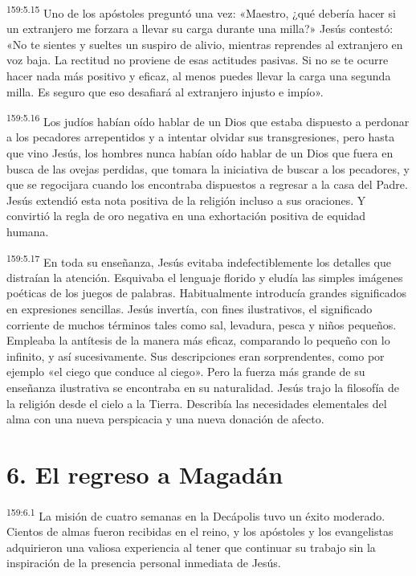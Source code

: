 \par 
\textsuperscript{159:5.15} Uno de los apóstoles preguntó una vez: «Maestro, ¿qué debería hacer si un extranjero me forzara a llevar su carga durante una milla?» Jesús contestó: «No te sientes y sueltes un suspiro de alivio, mientras reprendes al extranjero en voz baja. La rectitud no proviene de esas actitudes pasivas. Si no se te ocurre hacer nada más positivo y eficaz, al menos puedes llevar la carga una segunda milla. Es seguro que eso desafiará al extranjero injusto e impío».

\par 
\textsuperscript{159:5.16} Los judíos habían oído hablar de un Dios que estaba dispuesto a perdonar a los pecadores arrepentidos y a intentar olvidar sus transgresiones, pero hasta que vino Jesús, los hombres nunca habían oído hablar de un Dios que fuera en busca de las ovejas perdidas, que tomara la iniciativa de buscar a los pecadores, y que se regocijara cuando los encontraba dispuestos a regresar a la casa del Padre. Jesús extendió esta nota positiva de la religión incluso a sus oraciones. Y convirtió la regla de oro negativa en una exhortación positiva de equidad humana.

\par 
\textsuperscript{159:5.17} En toda su enseñanza, Jesús evitaba indefectiblemente los detalles que distraían la atención. Esquivaba el lenguaje florido y eludía las simples imágenes poéticas de los juegos de palabras. Habitualmente introducía grandes significados en expresiones sencillas. Jesús invertía, con fines ilustrativos, el significado corriente de muchos términos tales como sal, levadura, pesca y niños pequeños. Empleaba la antítesis de la manera más eficaz, comparando lo pequeño con lo infinito, y así sucesivamente. Sus descripciones eran sorprendentes, como por ejemplo «el ciego que conduce al ciego». Pero la fuerza más grande de su enseñanza ilustrativa se encontraba en su naturalidad. Jesús trajo la filosofía de la religión desde el cielo a la Tierra. Describía las necesidades elementales del alma con una nueva perspicacia y una nueva donación de afecto.

\section*{6. El regreso a Magadán}
\par 
\textsuperscript{159:6.1} La misión de cuatro semanas en la Decápolis tuvo un éxito moderado. Cientos de almas fueron recibidas en el reino, y los apóstoles y los evangelistas adquirieron una valiosa experiencia al tener que continuar su trabajo sin la inspiración de la presencia personal inmediata de Jesús.

